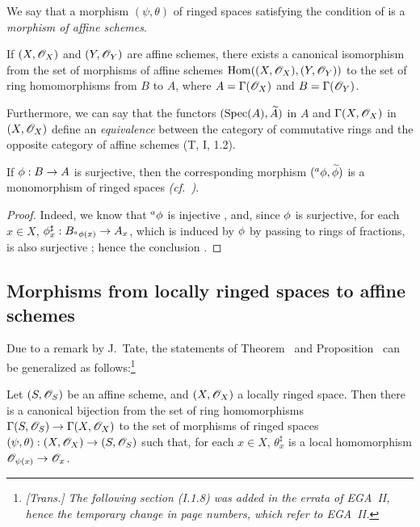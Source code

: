 We say that a morphism $(\psi,\theta)$ of ringed spaces satisfying the condition of  is a \emph{morphism of affine schemes}.

\begin{corollary}[1.7.4]
\label{I.1.7.4}
If $(X,\mathscr{O}_X)$ and $(Y,\mathscr{O}_Y)$ are affine schemes, there exists a canonical isomorphism from the set of morphisms of affine schemes $\operatorname{Hom}((X,\mathscr{O}_X),(Y,\mathscr{O}_Y))$ to the set of ring homomorphisms from $B$ to $A$, where $A=\Gamma(\mathscr{O}_X)$ and $B=\Gamma(\mathscr{O}_Y)$.
\end{corollary}

Furthermore, we can say that the functors $(\operatorname{Spec}(A),\widetilde{A})$ in $A$ and $\Gamma(X,\mathscr{O}_X)$ in $(X,\mathscr{O}_X)$ define an \emph{equivalence} between the category of commutative rings and the opposite category of affine schemes (T, I, 1.2).

\begin{corollary}[1.7.5]
\label{I.1.7.5}
If $\vphi:B\to A$ is surjective, then the corresponding morphism $({}^a\phi,\widetilde{\phi})$ is a monomorphism of ringed spaces \emph{(cf.~)}.
\end{corollary}

\begin{proof}
\label{proof-I.1.7.5}
Indeed, we know that ${}^a\phi$ is injective , and, since $\phi$ is
surjective, for each $x\in X$, $\vphi_x^\sharp:B_{{}^a\vphi(x)}\to A_x$, which is induced by $\phi$ by passing to rings of fractions, is also surjective ;
hence the conclusion .
\end{proof}

\subsection{Morphisms from locally ringed spaces to affine schemes}
\label{subsection:I.1.8}

Due to a remark by J.~Tate, the statements of Theorem~ and Proposition~ can be generalized as follows:\footnote{\emph{[Trans.] The following section (I.1.8) was added in the errata of EGA~II, hence the temporary change in page numbers, which refer to EGA~II.}}

\begin{proposition}[1.8.1]
\label{I.1.8.1}
Let $(S,\mathscr{O}_S)$ be an affine scheme, and $(X,\mathscr{O}_X)$ a locally ringed space.
Then there is a canonical bijection from the set of ring homomorphisms
$\Gamma(S,\sh{O}_S)\to\Gamma(X,\sh{O}_X)$ to the set of morphisms of ringed spaces $(\psi,\theta):(X,\sh{O}_X)\to(S,\sh{O}_S)$ such that, for each $x\in X$, $\theta_x^\sharp$ is a local homomorphism $\sh{O}_{\psi(x)}\to\sh{O}_x$.
\end{proposition}


